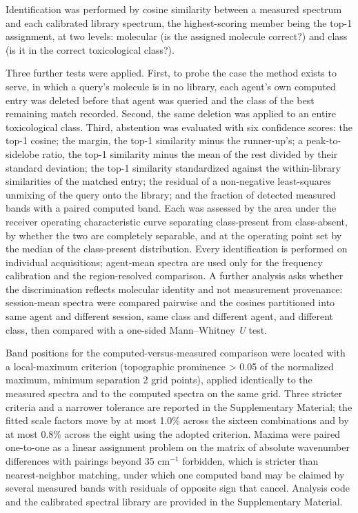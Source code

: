 \documentclass[review,12pt]{elsarticle}
\newcommand*\wn{\ensuremath{\text{cm}^{-1}}}
\begin{document}
Identification was performed by cosine similarity between a measured spectrum and each calibrated library spectrum, the highest-scoring member being the top-1 assignment, at two levels: molecular (is the assigned molecule correct?) and class (is it in the correct toxicological class?).

Three further tests were applied. First, to probe the case the method exists to serve, in which a query's molecule is in no library, each agent's own computed entry was deleted before that agent was queried and the class of the best remaining match recorded. Second, the same deletion was applied to an entire toxicological class. Third, abstention was evaluated with six confidence scores: the top-1 cosine; the margin, the top-1 similarity minus the runner-up's; a peak-to-sidelobe ratio, the top-1 similarity minus the mean of the rest divided by their standard deviation; the top-1 similarity standardized against the within-library similarities of the matched entry; the residual of a non-negative least-squares unmixing of the query onto the library; and the fraction of detected measured bands with a paired computed band. Each was assessed by the area under the receiver operating characteristic curve separating class-present from class-absent, by whether the two are completely separable, and at the operating point set by the median of the class-present distribution. Every identification is performed on individual acquisitions; agent-mean spectra are used only for the frequency calibration and the region-resolved comparison. A further analysis asks whether the discrimination reflects molecular identity and not measurement provenance: session-mean spectra were compared pairwise and the cosines partitioned into same agent and different session, same class and different agent, and different class, then compared with a one-sided Mann--Whitney \textit{U} test.

Band positions for the computed-versus-measured comparison were located with a local-maximum criterion (topographic prominence > 0.05 of the normalized maximum, minimum separation 2 grid points), applied identically to the measured spectra and to the computed spectra on the same grid. Three stricter criteria and a narrower tolerance are reported in the Supplementary Material; the fitted scale factors move by at most 1.0\% across the sixteen combinations and by at most 0.8\% across the eight using the adopted criterion. Maxima were paired one-to-one as a linear assignment problem on the matrix of absolute wavenumber differences with pairings beyond 35 \wn{} forbidden, which is stricter than nearest-neighbor matching, under which one computed band may be claimed by several measured bands with residuals of opposite sign that cancel. Analysis code and the calibrated spectral library are provided in the Supplementary Material.
\end{document}
